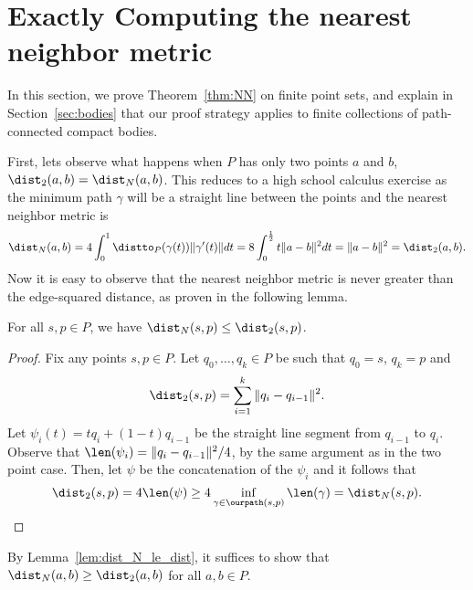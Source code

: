 \section{Exactly Computing the nearest neighbor metric}
\label{sec:NN}
In this section, we prove Theorem~\ref{thm:NN} on finite point sets, and
explain in Section~\ref{sec:bodies} that our proof strategy applies to
finite collections of path-connected compact bodies.

  First, lets observe what happens when $P$ has only two points $a$ and
$b$, $\dist_2(a,b) = \dist_N(a,b)$.  This reduces to a high school calculus
exercise as the minimum path $\gamma$ will be a straight line between the
points and the nearest neighbor metric is \[
    \dist_N(a,b) = 4\int_0^1 \distto_P(\gamma(t))\|\gamma'(t)\|dt = 8\int_0^{\frac{1}{2}} t \|a - b\|^2 dt = \|a - b\|^2 = \dist_2(a,b).
  \]
  Now it is easy to observe that the
  nearest neighbor metric is never greater than the
  edge-squared distance, as proven in the following lemma.

  \begin{lemma}\label{lem:dist_N_le_dist}
    For all $s,p\in P$, we have $\dist_N(s,p)\le \dist_2(s,p)$.
  \end{lemma}
  \begin{proof}
    Fix any points $s,p\in P$.
    Let $q_0,\ldots, q_k \in P$ be such that $q_0 = s$, $q_k = p$ and
    \[
      \dist_2(s,p) = \sum_{i=1}^k \|q_i - q_{i-1}\|^2.
    \]
    Let $\psi_i(t) = tq_i + (1-t)q_{i-1}$ be the straight line segment from $q_{i-1}$ to $q_i$.
    Observe that $\len(\psi_i) = \|q_i - q_{i-1}\|^2 / 4$, by the same argument as in the two point case.
    Then, let $\psi$ be the concatenation of the $\psi_i$ and it follows that
    \[
      \dist_2(s,p) = 4 \len(\psi) \ge 4 \inf_{\gamma\in \ourpath(s,p)} \len(\gamma) = \dist_N(s,p).\qedhere
    \]
  \end{proof}
By Lemma~\ref{lem:dist_N_le_dist}, it suffices to show that $\dist_N(a, b) \geq \dist_2(a,b)$ for all $a, b \in P$.

